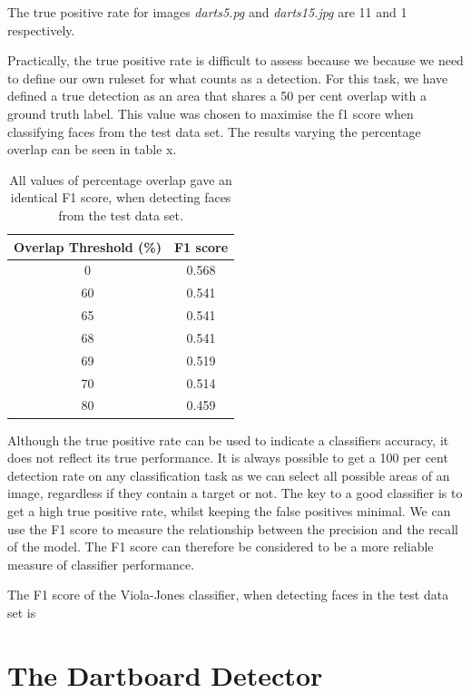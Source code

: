 \documentclass[conference]{IEEEtran}
\begin{document}
\par 
The true positive rate for images \emph{darts5.pg} and \emph{darts15.jpg} are 11 and 1 respectively. 
\par
Practically, the true positive rate is difficult to assess because we because we need to define our own ruleset for what counts as a detection. For this task, we have defined a true detection as an area that shares a 50 per cent overlap with a ground truth label. This value was chosen to maximise the f1 score when classifying faces from the test data set. The results varying the percentage overlap can be seen in table x. 
\par 
\begin{table}[!htp]
\caption{All values of percentage overlap gave an identical F1 score, when detecting faces from the test data set. }
\begin{center}
\begin{tabular}{||c|c||}
\hline
Overlap Threshold (\%) 	& F1 score 	\\ \hline
0 					& 0.568		\\
60 					& 0.541		\\
65					& 0.541		\\
68					& 0.541		\\
69					& 0.519		\\
70 					& 0.514		\\
80					& 0.459		\\ \hline
\end{tabular}
\end{center}
\label{default}
\end{table}%

\par
Although the true positive rate can be used to indicate a classifiers accuracy, it does not reflect its true performance. It is always possible to get a 100 per cent detection rate on any classification task as we can select all possible areas of an image, regardless if they contain a target or not. The key to a good classifier is to get a high true positive rate, whilst keeping the false positives minimal. We can use the F1 score to measure the relationship between the precision and the recall of the model. The F1 score can therefore be considered to be a more reliable measure of classifier performance.
\par
The F1 score of the Viola-Jones classifier, when detecting faces in the test data set is 


\newpage
\section{The Dartboard Detector}
\end{document}
